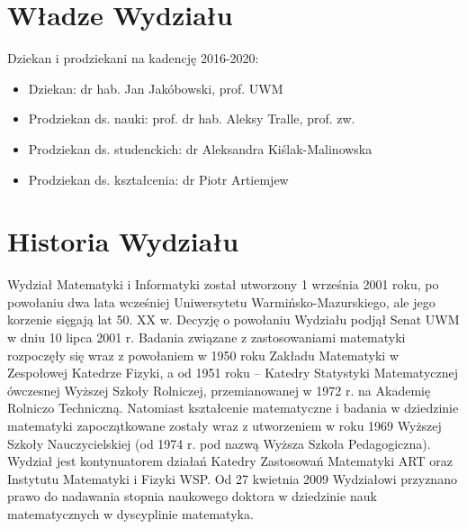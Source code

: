 \documentclass[a4paper,12pt]{article}
\begin{document}
\section{Władze Wydziału}
Dziekan i prodziekani na kadencję 2016-2020:
\begin{itemize}
\item{Dziekan: dr hab. Jan Jakóbowski, prof. UWM}
\item{Prodziekan ds. nauki: prof. dr hab. Aleksy Tralle, prof. zw.}
\item{Prodziekan ds. studenckich: dr Aleksandra Kiślak-Malinowska}
\item{Prodziekan ds. kształcenia: dr Piotr Artiemjew}
\end{itemize}

\section{Historia Wydziału}
Wydział Matematyki i Informatyki został utworzony 1 września 2001 roku, po powołaniu dwa lata wcześniej
Uniwersytetu Warmińsko-Mazurskiego, ale jego korzenie sięgają lat 50. XX w. Decyzję o powołaniu Wydziału
podjął Senat UWM w dniu 10 lipca 2001 r. Badania związane z zastosowaniami matematyki rozpoczęły się
wraz z powołaniem w 1950 roku Zakładu Matematyki w Zespołowej Katedrze Fizyki, a od 1951 roku –
Katedry Statystyki Matematycznej ówczesnej Wyższej Szkoły Rolniczej, przemianowanej w 1972 r. na
Akademię Rolniczo Techniczną. Natomiast kształcenie matematyczne i badania w dziedzinie matematyki
zapoczątkowane zostały wraz z utworzeniem w roku 1969 Wyższej Szkoły Nauczycielskiej (od 1974 r. pod nazwą Wyższa Szkoła Pedagogiczna). Wydział jest kontynuatorem działań Katedry Zastosowań Matematyki ART oraz Instytutu Matematyki i Fizyki WSP.
Od 27 kwietnia 2009 Wydziałowi przyznano prawo do nadawania stopnia naukowego doktora w dziedzinie
nauk matematycznych w dyscyplinie matematyka.
\end{document}

